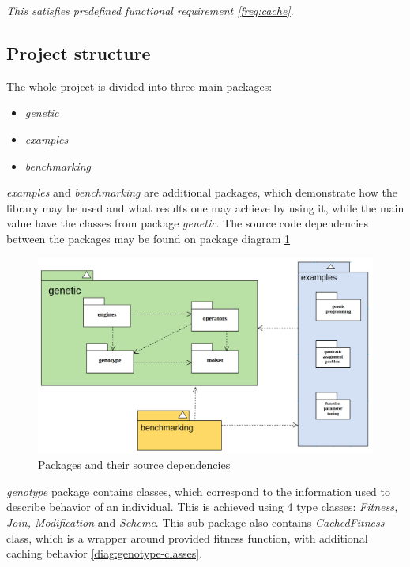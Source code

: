 \begin{itemize}
\smallskip\textit{This satisfies predefined functional requirement \ref{freq:cache}}.
 
\medbreak

\end{itemize}

\subsection{Project structure}

The whole project is divided into three main packages:
\begin{itemize}
\item \textit{genetic}
\item \textit{examples}
\item \textit{benchmarking}
\end{itemize}

\textit{examples} and \textit{benchmarking} are additional packages, which demonstrate how the library may be used and what results one may achieve by using it, while the main value have the classes from package \textit{genetic}. The source code dependencies between the packages may be found on package diagram \ref{diag:packages}

\begin{figure}[h]
\centering\includegraphics[width=1.\textwidth]{img/diagrams/alleles-top-packages}
\caption{Packages and their source dependencies}\label{diag:packages}
\end{figure}

\textit{genotype} package contains classes, which correspond to the information used to describe behavior of an individual. This is achieved using 4 type classes: \textit{Fitness, Join, Modification} and \textit{Scheme}. This sub-package also contains \textit{CachedFitness} class, which is a wrapper around provided fitness function, with additional caching behavior \ref{diag:genotype-classes}. 

